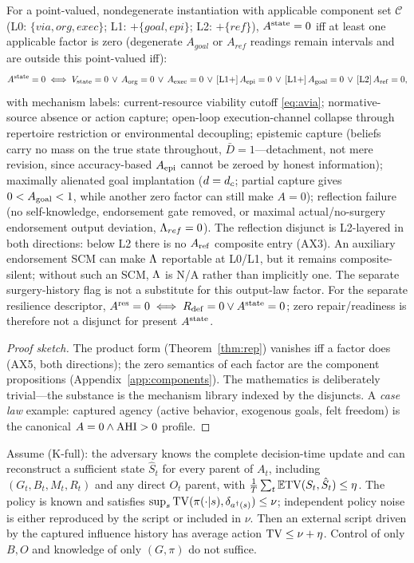 \begin{corollary}\label{thm:t5}
For a point-valued, nondegenerate instantiation with applicable component set
$\mathcal{C}$ (L0: $\{via,org,exec\}$; L1: $+\{goal,epi\}$; L2: $+\{ref\}$),
$A^{\mathrm{state}}=0$ iff at least one applicable factor is zero (degenerate $A_{goal}$ or
$A_{ref}$ readings remain intervals and are outside this point-valued iff):
\begin{equation}\label{eq:t5}
A^{\mathrm{state}}=0 \iff V_{\mathrm{state}}=0 \,\vee\, A_{\mathrm{org}}=0 \,\vee\, A_{\mathrm{exec}}=0
\,\vee\, [\text{L1+}]\,A_{\mathrm{epi}}=0 \,\vee\, [\text{L1+}]\,A_{\mathrm{goal}}=0
\,\vee\, [\text{L2}]\,A_{\mathrm{ref}}=0,
\end{equation}
with mechanism labels: current-resource viability cutoff \eqref{eq:avia};
normative-source absence or action capture; open-loop execution-channel collapse
through repertoire restriction or environmental decoupling;
epistemic capture (beliefs carry no mass on the true state throughout,
$\bar D=1$---detachment, not mere revision, since accuracy-based $A_{\mathrm{epi}}$
cannot be zeroed by honest information); maximally alienated goal implantation
($d=d_{c}$; partial capture gives $0<A_{\mathrm{goal}}<1$, while another zero factor can
still make $A=0$); reflection failure (no self-knowledge, endorsement gate
removed, or maximal actual/no-surgery endorsement output deviation,
$\Lambda_{ref}=0$). The reflection disjunct is L2-layered in both directions:
below L2 there is no $A_{\mathrm{ref}}$ composite entry (AX3). An auxiliary endorsement
SCM can make $\Lambda$ reportable at L0/L1, but it remains composite-silent;
without such an SCM, $\Lambda$ is N/A rather than implicitly one. The separate
surgery-history flag is not a substitute for this output-law factor. For the
separate resilience descriptor, $A^{\mathrm{res}}=0\iff R_{\mathrm{def}}=0\vee A^{\mathrm{state}}=0$; zero
repair/readiness is therefore not a disjunct for present $A^{\mathrm{state}}$.
\end{corollary}
\begin{proof}[Proof sketch]
The product form (Theorem~\ref{thm:rep}) vanishes iff a factor does (AX5, both
directions); the zero semantics of each factor are
the component propositions (Appendix~\ref{app:components}). The mathematics is deliberately trivial---the substance
is the mechanism library indexed by the disjuncts. A \emph{case law} example:
captured agency (active behavior, exogenous goals, felt freedom) is the
canonical $A=0\wedge\mathrm{AHI}>0$ profile.
\end{proof}

\begin{corollary}
\label{cor:script}
Assume \textup{(K-full)}: the adversary knows the complete decision-time
update and can reconstruct a sufficient state $\hat S_t$ for every parent of
$A_t$, including $(G_t,B_t,M_t,R_t)$ and any direct $O_t$ parent, with
$\frac1T\sum_t\mathbb E\mathrm{TV}(S_t,\hat S_t)\le\eta$. The policy is known and
satisfies $\sup_s\mathrm{TV}(\pi(\cdot|s),\delta_{a^\dagger(s)})\le\nu$; independent
policy noise is either reproduced by the script or included in $\nu$. Then an
external script driven by the captured influence history has average action
$\mathrm{TV}\le\nu+\eta$. Control of only $B,O$ and knowledge of only $(G,\pi)$ do not
suffice.
\end{corollary}

